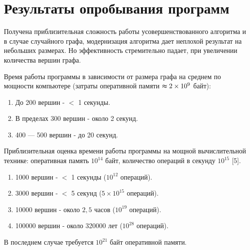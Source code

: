 \section{Результаты опробывания программ}
\label{sec:Results_7} 
\large 


Получена приблизительная сложность работы усовершенствованного алгоритма и в случае случайного графа, модернизация алгоритма дает неплохой результат на небольших размерах. Но эффективность стремительно падает, при увеличении количества вершин графа.

Время работы программы в зависимости от размера графа на среднем по мощности компьютере (затраты оперативной памяти $\thickapprox 2\times 10^9$ байт):
\begin{enumerate}
\item  До 200 вершин - $<$ 1 секунды.
\item  В пределах 300 вершин - около 2 секунд.
\item  400 — 500 вершин - до 20 секунд.
\end{enumerate}




Приблизительная оценка времени работы программы на мощной вычислительной технике:
оперативная память $10^{14}$ байт,
количество операций в секунду $10^{15}$ [5].
\begin{enumerate}
\item 1000 вершин - $<$ 1 секунды  ($10^{12}$  операций).
\item 3000 вершин - $<$ 5 секунд ($5\times 10^{15}$ операций).
\item 10000 вершин - около $2,5$ часов ($10^{19}$ операций).
\item 100000 вершин - около 320000 лет ($10 ^{28}$ операций).
\end{enumerate}
В последнем случае требуется $10^{21}$ байт оперативной памяти.

